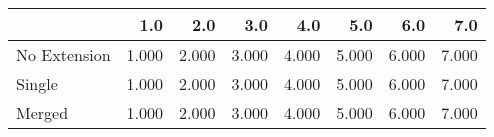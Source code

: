\begin{tabular}{lrrrrrrr}
\toprule
{} &   1.0 &   2.0 &   3.0 &   4.0 &   5.0 &   6.0 &   7.0 \\
\midrule
No Extension & 1.000 & 2.000 & 3.000 & 4.000 & 5.000 & 6.000 & 7.000 \\
Single       & 1.000 & 2.000 & 3.000 & 4.000 & 5.000 & 6.000 & 7.000 \\
Merged       & 1.000 & 2.000 & 3.000 & 4.000 & 5.000 & 6.000 & 7.000 \\
\bottomrule
\end{tabular}

